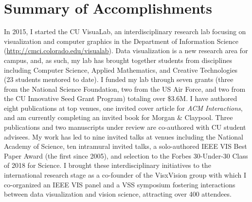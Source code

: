 \documentclass[11pt]{article}
\begin{document}

\section*{Summary of Accomplishments}

In 2015, I started the CU VisuaLab, an interdisciplinary research lab focusing on visualization and computer graphics in the Department of Information Science (\href{http://cmci.colorado.edu/visualab}{http://cmci.colorado.edu/visualab}). Data visualization is a new research area for campus, and, as such, my lab has brought together students from disciplines including Computer Science, Applied Mathematics, and Creative Technologies (23 students mentored to date). I funded my lab through seven grants (three from the National Science Foundation, two from the US Air Force, and two from the CU Innovative Seed Grant Program) totaling over \$3.6M. 
I have authored eight publications at top venues, one invited cover article for \emph{ACM Interactions}, and am currently completing an invited book for Morgan \& Claypool. Three publications and two manuscripts under review are co-authored with CU student advisees. My work has led to nine invited talks at venues including the National Academy of Science, ten intramural invited talks, a solo-authored IEEE VIS Best Paper Award (the first since 2005), and selection to the Forbes 30-Under-30 Class of 2018 for Science. I brought these interdisciplinary initiatives to the international research stage as a co-founder of the VisxVision group with which I co-organized an IEEE VIS panel and a VSS symposium fostering interactions between data visualization and vision science, attracting over 400 attendees. 
\end{document}
